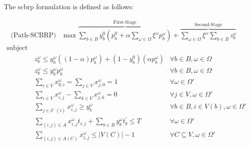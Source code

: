 The \gls{scbrp} formulation is defined as follows:

\begin{align}
	\text{(Path-SCBRP)} & \max \overbrace{\sum_{b \in B} y_{b}^{0}(p_{b}^{0} + \alpha \sum_{\omega \in \Omega} \xi^{\omega} p_{b}^{\omega})}^{\text{First-Stage}} + \overbrace{\sum_{\omega \in \Omega} \xi^{\omega} \sum_{b \in B} z_{b}^{\omega}}^{\text{Second-Stage}} & \label{eq:sof}
\end{align}
\begin{align}
	\nonumber \text{subject to:} &                                                                                                         &                                                                                     \\
	                             & z_{b}^{\omega} \leq y_{b}^{\omega}((1 - \alpha)p_{b}^{\omega}) + (1 - y_{b}^{0})(\alpha p_{b}^{\omega}) & \forall b \in B, \omega \in \Omega \label{eq:stochastic-z-value}                    \\
	                             & z_{b}^{\omega} \leq y_{b}^{\omega}p_{b}^{\omega}                                                        & \forall b \in B, \omega \in \Omega \label{eq:stochastic-z-y-value}                  \\
	                             & \sum_{i \in V} x_{0,i}^{\omega} = \sum_{j \in V} x_{j,0}^{\omega} = 1                                   & \forall \omega \in \Omega' \label{eq:stochastic-s-t-all}                            \\
	                             & \sum_{i \in V} x_{i,j}^{\omega} - \sum_{k \in V} x_{j,k}^{\omega} = 0                                   & \forall j \in V, \omega \in \Omega' \label{eq:stochastic-flow-conservation}         \\
	                             & \sum_{j \in \delta^{-}(i)} x_{i,j}^{\omega} \geq y_{b}^{\omega}                                         & \forall b \in B, i \in V(b), \omega \in \Omega' \label{eq:stochastic-in-path}       \\
	                             & \sum_{(i, j) \in A} x_{i,j}^{\omega}t_{i,j} + \sum_{b \in B} y_{b}^{\omega}t^{'}_{b} \leq T             & \forall \omega \in \Omega' \label{eq:stochastic-max-time}                           \\
	                             & \sum_{(i, j) \in A(C)} x_{i,j}^{\omega} \leq |V(C)| - 1                                                 & \forall C \subseteq V, \omega \in \Omega' \label{eq:stochastic-subtour-elimination} \\

\end{align}
